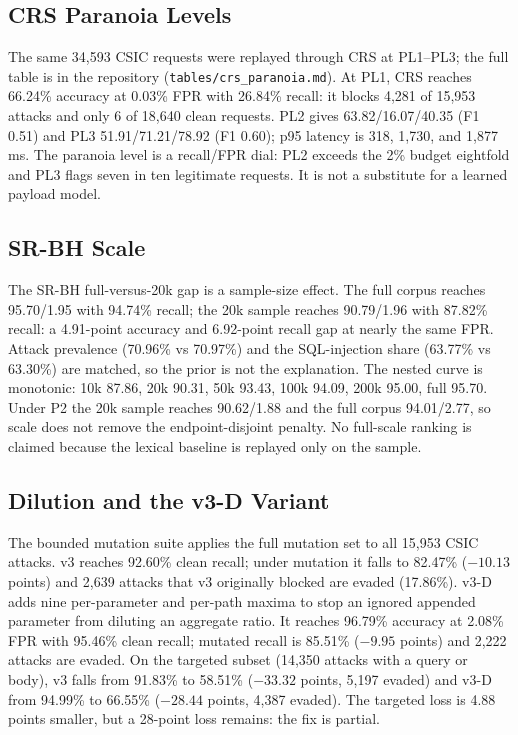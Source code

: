\documentclass[conference]{IEEEtran}
\begin{document}
\subsection{CRS Paranoia Levels}
\label{sec:crs}
The same 34,593 CSIC requests were replayed through CRS at PL1--PL3; the full table is in the repository (\texttt{tables/crs\_paranoia.md}). At PL1, CRS reaches 66.24\% accuracy at 0.03\% FPR with 26.84\% recall: it blocks 4,281 of 15,953 attacks and only 6 of 18,640 clean requests. PL2 gives 63.82/16.07/40.35 (F1 0.51) and PL3 51.91/71.21/78.92 (F1 0.60); p95 latency is 318, 1,730, and 1,877\,ms. The paranoia level is a recall/FPR dial: PL2 exceeds the 2\% budget eightfold and PL3 flags seven in ten legitimate requests. It is not a substitute for a learned payload model.

\subsection{SR-BH Scale}
The SR-BH full-versus-20k gap is a sample-size effect. The full corpus reaches 95.70/1.95 with 94.74\% recall; the 20k sample reaches 90.79/1.96 with 87.82\% recall: a 4.91-point accuracy and 6.92-point recall gap at nearly the same FPR. Attack prevalence (70.96\% vs 70.97\%) and the SQL-injection share (63.77\% vs 63.30\%) are matched, so the prior is not the explanation. The nested curve is monotonic: 10k 87.86, 20k 90.31, 50k 93.43, 100k 94.09, 200k 95.00, full 95.70. Under P2 the 20k sample reaches 90.62/1.88 and the full corpus 94.01/2.77, so scale does not remove the endpoint-disjoint penalty. No full-scale ranking is claimed because the lexical baseline is replayed only on the sample.

\subsection{Dilution and the v3-D Variant}
The bounded mutation suite applies the full mutation set to all 15,953 CSIC attacks. v3 reaches 92.60\% clean recall; under mutation it falls to 82.47\% ($-10.13$ points) and 2,639 attacks that v3 originally blocked are evaded (17.86\%). v3-D adds nine per-parameter and per-path maxima to stop an ignored appended parameter from diluting an aggregate ratio. It reaches 96.79\% accuracy at 2.08\% FPR with 95.46\% clean recall; mutated recall is 85.51\% ($-9.95$ points) and 2,222 attacks are evaded. On the targeted subset (14,350 attacks with a query or body), v3 falls from 91.83\% to 58.51\% ($-33.32$ points, 5,197 evaded) and v3-D from 94.99\% to 66.55\% ($-28.44$ points, 4,387 evaded). The targeted loss is 4.88 points smaller, but a 28-point loss remains: the fix is partial.
\end{document}
